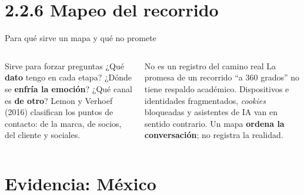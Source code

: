 \documentclass[aspectratio=169,xcolor=dvipsnames]{beamer}
\newcommand{\figtikz}[1]{../../libro-consumidor-digital/figuras/tikz/#1}
\newcommand{\fuente}[1]{{\tiny\color{IPNgris}Fuente: #1}}
\begin{document}
\section[Mapeo]{2.2.6 Mapeo del recorrido}

\begin{frame}{Un mapa de recorrido (caso ilustrativo)}
\begin{center}
  }
\end{center}
\fuente{elaboración propia. Caso ficticio.}
\end{frame}

\begin{frame}{Para qué sirve un mapa y qué no promete}
\begin{columns}[T]
  \begin{exampleblock}{Sirve para forzar preguntas}
    \small ¿Qué \textbf{dato} tengo en cada etapa? ¿Dónde se \textbf{enfría la emoción}? ¿Qué canal es \textbf{de otro}? Lemon y Verhoef (2016) clasifican los puntos de contacto: de la marca, de socios, del cliente y sociales.
  \end{exampleblock}
  \begin{alertblock}{No es un registro del camino real}
    \small La promesa de un recorrido \enquote{a 360 grados} no tiene respaldo académico. Dispositivos e identidades fragmentados, \textit{cookies} bloqueadas y asistentes de IA van en sentido contrario. Un mapa \textbf{ordena la conversación}; no registra la realidad.
  \end{alertblock}
\end{columns}
\end{frame}

\section[Evidencia]{Evidencia: México}
\end{document}
